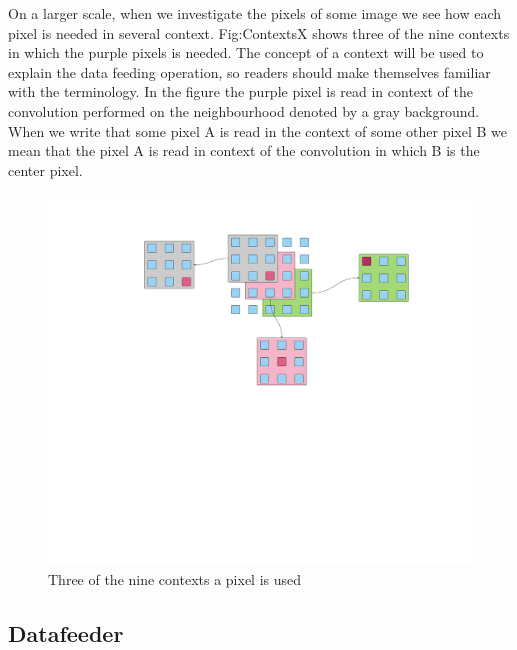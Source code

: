 On a larger scale, when we investigate the pixels of some image we see how each pixel is needed in several context. Fig:ContextsX shows three of the nine contexts in which the purple pixels is needed.
The concept of a context will be used to explain the data feeding operation, so readers should make themselves familiar with the terminology. 
In the figure the purple pixel is read in context of the convolution performed on the neighbourhood denoted by a gray background. 
When we write that some pixel A is read in the context of some other pixel B we mean that the pixel A is read in context of the convolution in which B is the center pixel. 
\begin{figure}[h!]
    \includegraphics[width=\linewidth]{img/Contexts5.png}
    \caption{Three of the nine contexts a pixel is used}
    \label{fig:ConvolutionContexts}
\end{figure}


\subsection{Datafeeder}

